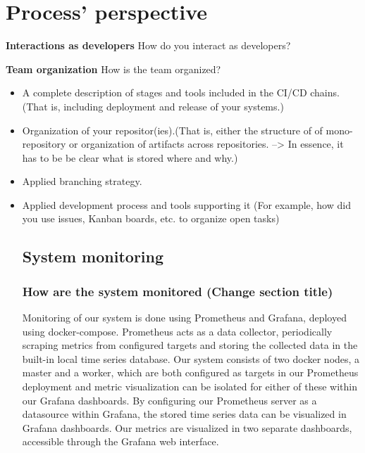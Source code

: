 \section{Process' perspective}

\textbf{Interactions as developers}\newline
 How do you interact as developers?\newline
 
\newline
\textbf{Team organization}\newline
  How is the team organized?\newline
  \begin{itemize}
  \item A complete description of stages and tools included in the CI/CD chains.(That is, including deployment and release of your systems.)
  \item Organization of your repositor(ies).(That is, either the structure of of mono-repository or organization of artifacts across repositories. --> In essence, it has to be be clear what is stored where and why.)
  \item Applied branching strategy.
  \item Applied development process and tools supporting it (For example, how did you use issues, Kanban boards, etc. to organize open tasks)
  \subsection{System monitoring}
  \subsubsection{How are the system monitored (Change section title)}
  Monitoring of our system is done using Prometheus and Grafana, deployed using docker-compose. \newline
  Prometheus acts as a data collector, periodically scraping metrics from configured targets and storing the collected data in the built-in local time series database.\newline
  Our system consists of two docker nodes, a master and a worker, which are both configured as targets in our Prometheus deployment and metric visualization can be isolated for either of these within our Grafana dashboards.\newline
  By configuring our Prometheus server as a datasource within Grafana, the stored time series data can be visualized in Grafana dashboards. Our metrics are visualized in two separate dashboards, accessible through the Grafana web interface.


\end{itemize}
